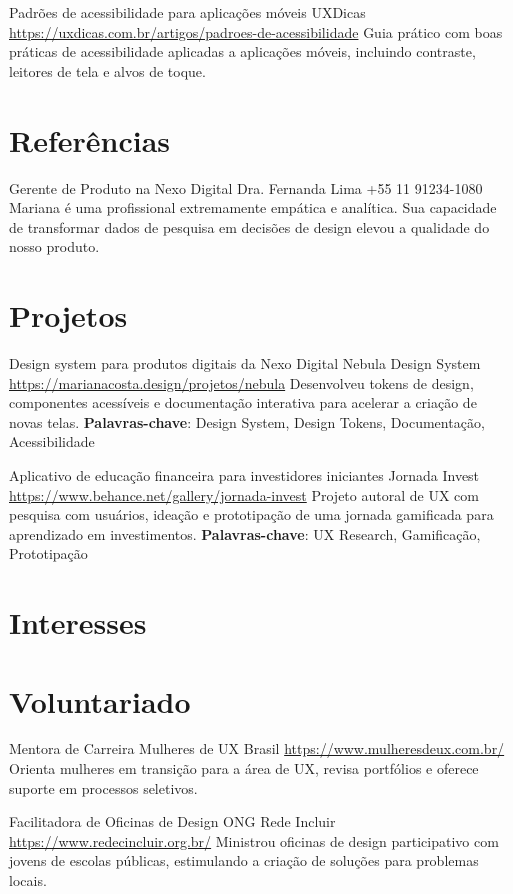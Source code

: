 \documentclass[a4paper, serif, 10pt]{moderncv}
\begin{document}
        {Padrões de acessibilidade para aplicações móveis}
        {UXDicas}
        {\url{https://uxdicas.com.br/artigos/padroes-de-acessibilidade}}
        {}
        {Guia prático com boas práticas de acessibilidade aplicadas a aplicações móveis, incluindo contraste, leitores de tela e alvos de toque.}
\section{Referências}

        {Gerente de Produto na Nexo Digital}
        {Dra. Fernanda Lima}
        {+55 11 91234-1080}
        {}
        {Mariana é uma profissional extremamente empática e analítica. Sua capacidade de transformar dados de pesquisa em decisões de design elevou a qualidade do nosso produto.}
\section{Projetos}

        {Design system para produtos digitais da Nexo Digital}
        {Nebula Design System}
        {\url{https://marianacosta.design/projetos/nebula}}
        {}
        {Desenvolveu tokens de design, componentes acessíveis e documentação interativa para acelerar a criação de novas telas.
\textbf{Palavras-chave}: Design System, Design Tokens, Documentação, Acessibilidade}

        {Aplicativo de educação financeira para investidores iniciantes}
        {Jornada Invest}
        {\url{https://www.behance.net/gallery/jornada-invest}}
        {}
        {Projeto autoral de UX com pesquisa com usuários, ideação e prototipação de uma jornada gamificada para aprendizado em investimentos.
\textbf{Palavras-chave}: UX Research, Gamificação, Prototipação}
\section{Interesses}

\section{Voluntariado}

        {Mentora de Carreira}
        {Mulheres de UX Brasil}
        {\url{https://www.mulheresdeux.com.br/}}
        {}
        {Orienta mulheres em transição para a área de UX, revisa portfólios e oferece suporte em processos seletivos.}
    

        {Facilitadora de Oficinas de Design}
        {ONG Rede Incluir}
        {\url{https://www.redecincluir.org.br/}}
        {}
        {Ministrou oficinas de design participativo com jovens de escolas públicas, estimulando a criação de soluções para problemas locais.}
    
\end{document}
